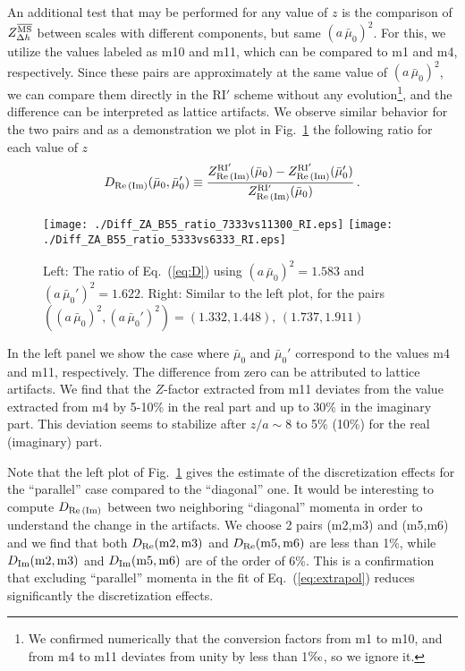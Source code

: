 \documentclass[12pt,tighten,nofootinbib,amssymb,floatfix]{article}
\newcommand{\MSb}{{\overline{\rm MS}}}
\newcommand{\be}{\begin{equation}}
\newcommand{\ee}{\end{equation}}
\begin{document}
An additional test that may be performed for any value of $z$ is the comparison of $Z_{\Delta h}^{\rm \MSb}$ between scales
with different components, but same $(a\,\bar\mu_0)^2$. For this, we utilize the values labeled as m10 and m11, which can be compared 
to m1 and m4, respectively. Since these pairs are approximately at the same value of $(a\,\bar\mu_0)^2$, we can compare them directly
in the RI$'$ scheme without any evolution\footnote{We confirmed numerically that the conversion factors from m1 to m10, and from m4 
to m11 deviates from unity by less than 1$\text{\textperthousand}$, so we ignore it.}, and the difference can be interpreted as lattice artifacts.
We observe similar
behavior for the two pairs and as a demonstration we plot in Fig.~\ref{fig:ZA_diff_m4_m11} the following ratio for each value of $z$
\be
\label{eq:D}
D_{\rm Re\,(Im)}(\bar\mu_0,\bar\mu_0')\equiv \frac{Z_{\rm Re\,(Im)}^{\rm RI'}(\bar\mu_0) - Z_{\rm Re\,(Im)}^{\rm RI'}(\bar\mu_0')}{Z_{\rm Re\,(Im)}^{\rm RI'}(\bar\mu_0)}\,.
\ee
\begin{figure}[h]
\centering
\texttt{[image: ./Diff\_ZA\_B55\_ratio\_7333vs11300\_RI.eps]}
\texttt{[image: ./Diff\_ZA\_B55\_ratio\_5333vs6333\_RI.eps]}
\vspace*{-0.3cm}
\begin{minipage}{15cm}
\hspace*{3cm}
\caption{\small{Left: The ratio of Eq.~(\ref{eq:D}) using $(a\,\bar\mu_0)^2{=}1.583$ and $(a\,\bar\mu_0')^2{=}1.622$. 
Right: Similar to the left plot, for the pairs $( (a\,\bar\mu_0)^2, (a\,\bar\mu_0')^2 ){=}(1.332, 1.448),\, (1.737,1.911)$}}
\label{fig:ZA_diff_m4_m11} 
\end{minipage}
\end{figure}

\vspace*{0.25cm}
In the left panel we show the case where $\bar\mu_0$ and $\bar\mu_0'$ correspond to the values m4 and m11, respectively. 
The difference from zero can be attributed to lattice artifacts. We find that the $Z$-factor extracted from m11 deviates from the value extracted 
from m4 by 5-10\% in the real part and up to 30\% in the imaginary part. This deviation seems to stabilize after $z/a{\sim}8$ to 5\% (10\%) 
for the real (imaginary) part.

Note that the left plot of Fig.~\ref{fig:ZA_diff_m4_m11} gives the estimate of the discretization effects for the ``parallel'' 
case compared to the ``diagonal'' one. It would be interesting to compute $D_{\rm Re\,(Im)}$ between two neighboring ``diagonal'' 
momenta in order to understand the change in the artifacts. We choose 2 pairs (m2,m3) and (m5,m6) and we find that both 
$D_{\rm Re}(\rm{m2,m3})$ and $D_{\rm Re}(\rm{m5,m6})$ are less than 1\%, while $D_{\rm Im}(\rm{m2,m3})$ and $D_{\rm Im}(\rm{m5,m6})$
are of the order of 6\%. This is a confirmation that excluding ``parallel'' momenta in the fit of Eq.~(\ref{eq:extrapol}) reduces
significantly the discretization effects.
\end{document}
